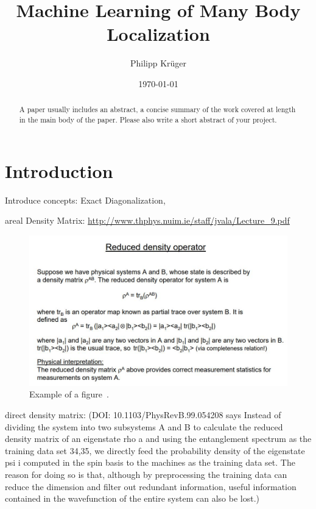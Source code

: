 \documentclass[reprint,amsmath,amssymb,aps,prb]{revtex4-2}
\begin{document}
%

\title{Machine Learning of Many Body Localization}

\author{Philipp Krüger}

\date{\today}%

\begin{abstract}
A paper usually includes an abstract, a concise summary of the work covered at length in the main body of the paper. Please also write a short abstract of your project.
\end{abstract}


\maketitle

\section{Introduction}%

Introduce concepts: Exact Diagonalization, 

areal Density Matrix:
\url{http://www.thphys.nuim.ie/staff/jvala/Lecture_9.pdf}

\begin{figure}[h!]
	\includegraphics[width=0.99\linewidth]{figures/reduced_density_matrix.jpg}
	\caption{Example of a figure~\cite{Orus2013}.}
	\label{fig:adm}
\end{figure}

direct density matrix:
(DOI: 10.1103/PhysRevB.99.054208 says 
Instead of dividing the system into two subsystems A
and B to calculate the reduced density matrix of an eigenstate rho a and using the entanglement spectrum as the training data set 34,35, we directly feed the
probability density of the eigenstate psi i computed in the
spin basis to the machines as the training data set. The
reason for doing so is that, although by preprocessing
the training data can reduce the dimension and filter out
redundant information, useful information contained in
the wavefunction of the entire system can also be lost.)
\end{document}
